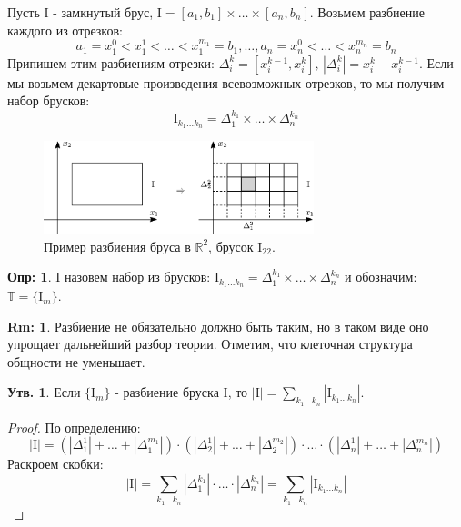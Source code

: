 \documentclass[12pt]{article}
\newcommand{\MR}{\mathbb{R}}
\newcommand{\MTB}{\mathbb{T}}
\newcommand{\MI}{\mathrm{I}}
\theoremstyle{definition}
\newtheorem{defn}{Опр:}
\newtheorem{rem}{Rm:}
\newtheorem{prop}{Утв.}
\newcommand{\ddsum}[2]{\displaystyle\sum\limits_{#1}^{#2}}
\begin{document}
Пусть $\MI$ - замкнутый брус, $\MI = [a_1,b_1]\times \dotsc \times [a_n,b_n]$. Возьмем разбиение каждого из отрезков: 
$$
	a_1 = x_1^0 < x_1^1 < \dotsc < x_1^{m_1} = b_1, \dotsc , a_n = x_n^0 < \dotsc < x_n^{m_n} = b_n
$$
Припишем этим разбиениям отрезки: $\Delta_i^k = \left[x_i^{k-1}, x_i^k\right], \, |\Delta_i^k| = x_i^{k} - x_i^{k-1}$. Если мы возьмем декартовые произведения всевозможных отрезков, то мы получим набор брусков:
$$
	\MI_{k_1\dotsc k_n} = \Delta_1^{k_1}\times \dotsc \times \Delta_n^{k_n}
$$ 
\begin{figure}[H]
	\centering
	\includegraphics[width=0.7\textwidth]{MA4L1_2.eps}
	\caption{Пример разбиения бруса в $\MR^2$, брусок $\MI_{22}$.}
	\label{4_2}
\end{figure}
\begin{defn}
	 $\MI$ назовем набор из брусков: $\MI_{k_1\dotsc k_n} = \Delta_1^{k_1}\times \dotsc \times \Delta_n^{k_n}$ и обозначим: $\MTB = \{\MI_m\}$.
\end{defn}
\begin{rem}
	Разбиение не обязательно должно быть таким, но в таком виде оно упрощает дальнейший разбор теории. Отметим, что клеточная структура общности не уменьшает.
\end{rem}

\begin{prop}
	Если $\{\MI_m\}$ - разбиение бруска $\MI$, то $|\MI| = \ddsum{k_1\dotsc k_n}{}|\MI_{k_1\dotsc k_n}|$.
\end{prop}
\begin{proof}
	По определению:
	$$
		|\MI| = \left(\left|\Delta_1^1\right| + \dotsc + \left|\Delta_1^{m_1}\right|\right){\cdot}\left(\left|\Delta_2^1\right| + \dotsc + \left|\Delta_2^{m_2}\right|\right){\cdot} \dotsc {\cdot} \left(\left|\Delta_n^1\right| + \dotsc + \left|\Delta_n^{m_n}\right|\right)
	$$  
	Раскроем скобки:
	$$
		|\MI| = \ddsum{k_1 \dotsc k_n}{}\left|\Delta_1^{k_1}\right|{\cdot}\dotsc{\cdot}\left|\Delta_n^{k_n}\right| = \ddsum{k_1 \dotsc k_n}{}|\MI_{k_1 \dotsc k_n}|
	$$
\end{proof}
\end{document}
